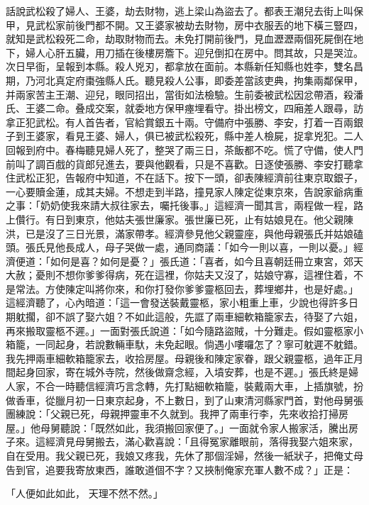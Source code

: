 \begin{showcontents}{}
話說武松殺了婦人、王婆，劫去財物，逃上梁山為盜去了。都表王潮兒去街上叫保甲，見武松家前後門都不開。又王婆家被劫去財物，房中衣服丟的地下橫三豎四，就知是武松殺死二命，劫取財物而去。未免打開前後門，見血瀝瀝兩個死屍倒在地下，婦人心肝五臟，用刀插在後樓房簷下。迎兒倒扣在房中。問其故，只是哭泣。次日早衙，呈報到本縣。殺人兇刃，都拿放在面前。本縣新任知縣也姓李，雙名昌期，乃河北真定府棗強縣人氏。聽見殺人公事，即委差當該吏典，拘集兩鄰保甲，并兩家苦主王潮、迎兒，眼同招出，當街如法檢驗。生前委被武松因忿帶酒，殺潘氏、王婆二命。叠成交案，就委地方保甲瘞埋看守。掛出榜文，四廂差人跟尋，訪拿正犯武松。有人首告者，官給賞銀五十兩。守備府中張勝、李安，打着一百兩銀子到王婆家，看見王婆、婦人，俱已被武松殺死，縣中差人檢屍，捉拿兇犯。二人回報到府中。春梅聽見婦人死了，整哭了兩三日，茶飯都不吃。慌了守備，使人門前叫了調百戲的貨郎兒進去，要與他觀看，只是不喜歡。日逐使張勝、李安打聽拿住武松正犯，告報府中知道，不在話下。按下一頭，卻表陳經濟前往東京取銀子，一心要贖金蓮，成其夫婦。不想走到半路，撞見家人陳定從東京來，告說家爺病重之事：「奶奶使我來請大叔往家去，囑托後事。」這經濟一聞其言，兩程做一程，路上儹行。有日到東京，他姑夫張世廉家。張世廉已死，止有姑娘見在。他父親陳洪，已是沒了三日光景，滿家帶孝。經濟參見他父親靈座，與他母親張氏并姑娘磕頭。張氏見他長成人，母子哭做一處，通同商議：「如今一則以喜，一則以憂。」經濟便道：「如何是喜？如何是憂？」張氏道：「喜者，如今且喜朝廷冊立東宮，郊天大赦；憂則不想你爹爹得病，死在這裡，你姑夫又沒了，姑娘守寡，這裡住着，不是常法。方使陳定叫將你來，和你打發你爹爹靈柩回去，葬埋鄉井，也是好處。」這經濟聽了，心內暗道：「這一會發送裝戴靈柩，家小粗重上車，少說也得許多日期躭擱，卻不誤了娶六姐？不如此這般，先誆了兩車細軟箱籠家去，待娶了六姐，再來搬取靈柩不遲。」一面對張氏說道：「如今隨路盜賊，十分難走。假如靈柩家小箱籠，一同起身，若說數輛車馱，未免起眼。倘遇小嘍囉怎了？寧可躭遲不躭錯。我先押兩車細軟箱籠家去，收拾房屋。母親後和陳定家眷，跟父親靈柩，過年正月間起身回家，寄在城外寺院，然後做齋念經，入墳安葬，也是不遲。」張氏終是婦人家，不合一時聽信經濟巧言念轉，先打點細軟箱籠，裝戴兩大車，上插旗號，扮做香車，從臘月初一日東京起身，不上數日，到了山東清河縣家門首，對他母舅張團練說：「父親已死，母親押靈車不久就到。我押了兩車行李，先來收拾打掃房屋。」他母舅聽說：「既然如此，我須搬回家便了。」一面就令家人搬家活，騰出房子來。這經濟見母舅搬去，滿心歡喜說：「且得冤家離眼前，落得我娶六姐來家，自在受用。我父親已死，我娘又疼我，先休了那個淫婦，然後一紙狀子，把俺丈母告到官，追要我寄放東西，誰敢道個不字？又挾制俺家充軍人數不成？」正是：

「人便如此如此，  天理不然不然。」


\end{showcontents}
